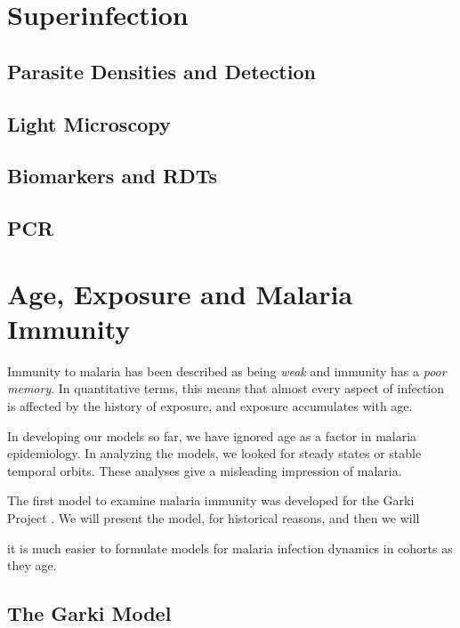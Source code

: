 \documentclass[
]{book}
\begin{document}
\chapter{Superinfection}\label{superinfection-3}

\section{Parasite Densities and Detection}\label{parasite-densities-and-detection}

\section{Light Microscopy}\label{light-microscopy}

\section{Biomarkers and RDTs}\label{biomarkers-and-rdts}

\section{PCR}\label{pcr}

\chapter{Age, Exposure and Malaria Immunity}\label{age-exposure-and-malaria-immunity}

Immunity to malaria has been described as being \emph{weak} and immunity has a \emph{poor memory}. In quantitative terms, this means that almost every aspect of infection is affected by the history of exposure, and exposure accumulates with age.

In developing our models so far, we have ignored age as a factor in malaria epidemiology. In analyzing the models, we looked for steady states or stable temporal orbits. These analyses give a misleading impression of malaria.

The first model to examine malaria immunity was developed for the Garki Project \autocite{DietzK1974GarkiModel}. We will present the model, for historical reasons, and then we will

it is much easier to formulate models for malaria infection dynamics in cohorts as they age.

\section{The Garki Model}\label{the-garki-model}
\end{document}
